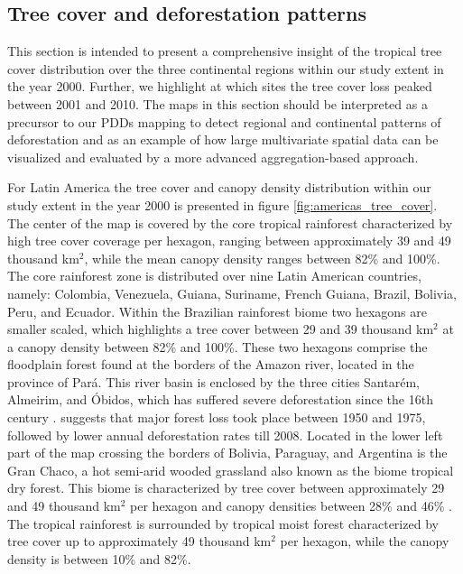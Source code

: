 		\subsection{Tree cover and deforestation patterns}
		\label{subsec:results_tree_cover_and_deforestation}
			This section is intended to present a comprehensive insight of the tropical tree cover distribution over the three continental regions within our study extent in the year 2000. Further, we highlight at which sites the tree cover loss peaked between 2001 and 2010. The maps in this section should be interpreted as a precursor to our \acp{PDD} mapping to detect regional and continental patterns of deforestation and as an example of how large multivariate spatial data can be visualized and evaluated by a more advanced aggregation-based approach.

			For Latin America the tree cover and canopy density distribution within our study extent in the year 2000 is presented in figure \ref{fig:americas_tree_cover}. The center of the map is covered by the core tropical rainforest characterized by high tree cover coverage per hexagon, ranging between approximately 39 and 49 thousand km$^2$, while the mean canopy density ranges between 82\% and 100\%. The core rainforest zone is distributed over nine Latin American countries, namely: Colombia, Venezuela, Guiana, Suriname, French Guiana, Brazil, Bolivia, Peru, and Ecuador. Within the Brazilian rainforest biome two hexagons are smaller scaled, which highlights a tree cover between 29 and 39 thousand km$^2$ at a canopy density between 82\% and 100\%. These two hexagons comprise the floodplain forest found at the borders of the Amazon river, located in the province of Pará. This river basin is enclosed by the three cities Santarém, Almeirim, and Óbidos, which has suffered severe deforestation since the 16th century \citep{Reno2011}. \citet{Reno2011} suggests that major forest loss took place between 1950 and 1975, followed by lower annual deforestation rates till 2008. Located in the lower left part of the map crossing the borders of Bolivia, Paraguay, and Argentina is the Gran Chaco, a hot semi-arid wooded grassland also known as the biome tropical dry forest. This biome is characterized by tree cover between approximately 29 and 49 thousand km$^2$ per hexagon and canopy densities between 28\% and 46\% \citep{Caldas2013}. The tropical rainforest is surrounded by tropical moist forest characterized by tree cover up to approximately 49 thousand km$^2$ per hexagon, while the canopy density is between 10\% and 82\%.
